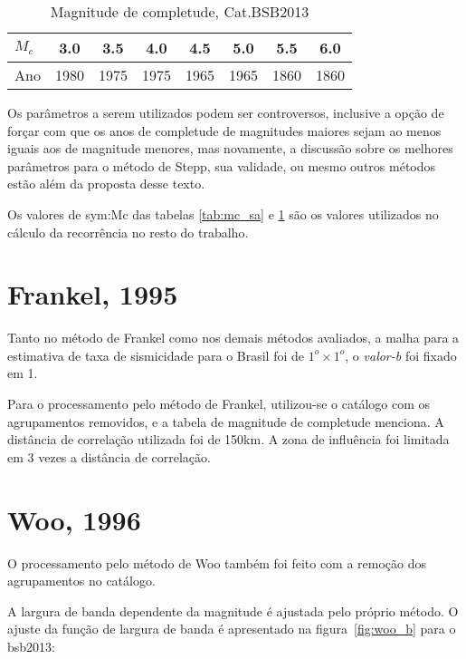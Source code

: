 	\begin{table}[h]
	  	\centering
		\begin{tabular}{l|*{7}{c}}
		$M_c$ & 3.0  & 3.5  & 4.0  & 4.5  & 5.0  & 5.5  & 6.0  \\  \hline
		Ano   & 1980 & 1975 & 1975 & 1965 & 1965 & 1860 & 1860 \\
		\end{tabular}
		\caption{Magnitude de completude, Cat.BSB2013}
		\label{tab:mc_br}
	\end{table}

Os parâmetros a serem utilizados podem ser controversos, inclusive a opção de forçar com que 
os anos de completude de magnitudes maiores sejam ao menos iguais aos de magnitude menores, 
mas novamente, a discussão sobre os melhores parâmetros para o método de Stepp, sua validade, ou 
mesmo outros métodos estão além da proposta desse texto.

Os valores de \gls{sym:Mc} das tabelas \ref{tab:mc_sa} e \ref{tab:mc_br} são os valores utilizados
no cálculo da recorrência no resto do trabalho.


\section{Frankel, 1995}
\label{sec:proc_frankel}

Tanto no método de Frankel como nos demais métodos avaliados,
a malha para a estimativa de taxa de sismicidade para o Brasil 
foi de $1^o \times 1^o$, o \emph{valor-b} foi fixado em 1.

Para o processamento pelo método de Frankel, utilizou-se o catálogo com os agrupamentos removidos,
e a tabela de magnitude de completude menciona. A distância de correlação utilizada foi 
de 150km. A zona de influência foi limitada em 3 vezes a distância de correlação.

\section{Woo, 1996}
\label{sec:proc_woo}

O processamento pelo método de Woo também foi feito com a remoção dos agrupamentos no catálogo.

A largura de banda dependente da magnitude é ajustada pelo próprio método.
O ajuste da função de largura de banda é apresentado na figura~\ref{fig:woo_b} para o \gls{bsb2013}:

